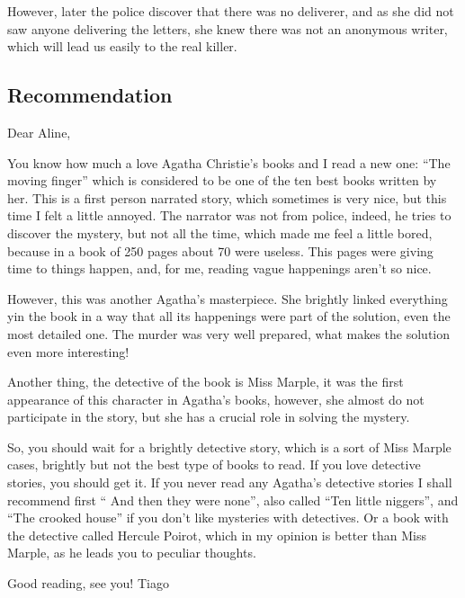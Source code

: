 \documentclass[a4paper,12pt]{article}
\begin{document}
\begin{description}
{    However, later the  police discover that there was no  deliverer, and as she
    did  not saw  anyone  delivering the  letters,  she knew  there  was not  an
    anonymous writer, which will lead us easily to the real killer.
  }

  
\end{description}



\subsection*{Recommendation}
Dear Aline,

You know  how much a love  Agatha Christie's books and  I read a  new one: ``The
moving finger'' which is considered to be one of the ten best books written by her. 
This is a first person narrated story, which sometimes is very nice, but this
time I felt a little annoyed. The narrator was not from police, indeed, he
tries to discover the mystery, but not all the time, which made me feel a little
bored, because in  a book of 250  pages about 70 were useless.  This pages were
giving time to things happen, and, for me, reading vague happenings aren't so nice.

However, this  was another Agatha's masterpiece. She  brightly linked everything
yin the book in a way that all its happenings were part of the solution, even the
most detailed one. The murder was very well prepared, what makes the solution even more interesting!

Another  thing, the  detective of  the book  is Miss  Marple, it  was  the first
appearance  of this  character in  Agatha's books,  however, she  almost  do not
participate in the story, but she has a crucial role in solving the mystery.

So, you  should wait for  a brightly  detective story, which  is a sort  of Miss
Marple cases,  brightly but  not the  best type of  books to  read. If  you love
detective stories, you should get it.   If you never read any Agatha's detective
stories I shall recommend first `` And then they were none'', also called ``Ten
little niggers'',  and ``The  crooked house'' if  you don't like  mysteries with
detectives. Or  a book  with the  detective called Hercule  Poirot, which  in my
opinion is better than Miss Marple, as he leads you to peculiar thoughts. 

Good reading, see you!
Tiago
\end{document}
